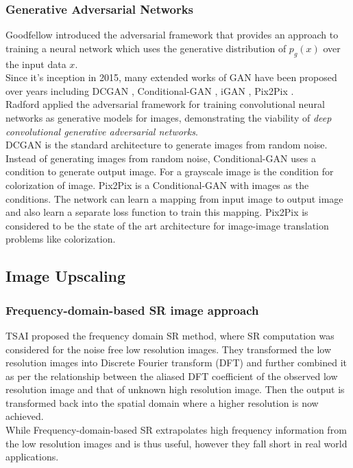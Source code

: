 \documentclass[10pt,twocolumn,letterpaper]{article}
\begin{document}
\subsubsection{Generative Adversarial Networks}
\hspace*{0.167 in}Goodfellow \etal\cite{goodfellow2014generative} introduced the adversarial framework that provides an approach to training a neural network which uses the generative distribution of $p_g(x)$ over the input data $x$.\\
\hspace*{0.167 in}Since it's inception in 2015, many extended works of GAN have been proposed over years including DCGAN \cite{radford2016unsupervised}, Conditional-GAN \cite{mirza2014conditional}, iGAN \cite{zhu2018generative}, Pix2Pix \cite{isola2018imagetoimage}.\\
\hspace*{0.167 in}Radford \etal\cite{radford2016unsupervised} applied the adversarial framework for training convolutional neural networks as generative models for images, demonstrating the viability of \textit{deep convolutional generative adversarial networks}.\\
\hspace*{0.167 in}DCGAN is the standard architecture to generate images from random noise. Instead of generating images from random noise, Conditional-GAN \cite{mirza2014conditional} uses a condition to generate output image. For \eg a grayscale image is the condition for colorization of image. Pix2Pix \cite{isola2018imagetoimage} is a Conditional-GAN with images as the conditions. The network can learn a mapping from input image to output image and also learn a separate loss function to train this mapping. Pix2Pix is considered to be the state of the art architecture for image-image translation problems like colorization.
\subsection{Image Upscaling}
\subsubsection{Frequency-domain-based SR image approach}
\hspace*{0.167 in} TSAI \cite{tsai1984multiframe} proposed the frequency domain SR method, where SR computation was considered for the noise free low resolution images. They transformed the low resolution images into Discrete Fourier transform (DFT) and further combined it as per the relationship between the aliased DFT coefficient of the observed low resolution image and that of unknown high resolution image. Then the output is transformed back into the spatial domain where a higher resolution is now achieved.\\
\hspace*{0.167 in} While Frequency-domain-based SR extrapolates high frequency information from the low resolution images and is thus useful, however they fall short in real world applications.
\end{document}
